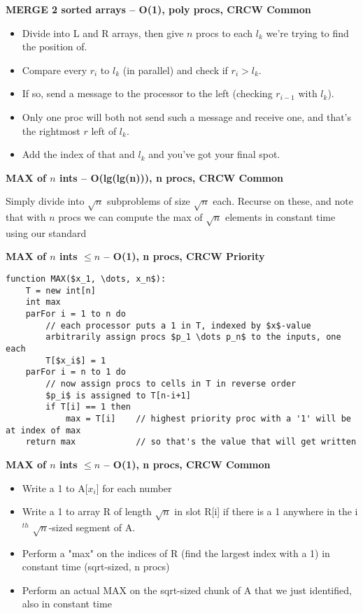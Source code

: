 \documentclass[12pt]{article}
\begin{document}
\begin{centering}\textbf{MERGE 2 sorted arrays -- O(1), poly procs, CRCW Common}\par\end{centering}
  \begin{itemize}
    \item Divide into L and R arrays, then give $n$ procs to each $l_k$ we're trying to find the position of.
    \item Compare every $r_i$ to $l_k$ (in parallel) and check if $r_i > l_k$.
    \item If so, send a message to the processor to the left (checking $r_{i-1}$ with $l_k$).
    \item Only one proc will both not send such a message and receive one, and that's the rightmost $r$ left of $l_k$.
    \item Add the index of that and $l_k$ and you've got your final spot.
\end{itemize}


\begin{centering}\textbf{MAX of $n$ ints -- O(lg(lg(n))), n procs, CRCW Common}\par\end{centering}
Simply divide into $\sqrt{n}$ subproblems of size $\sqrt{n}$ each. Recurse on these, and note that with $n$ procs
we can compute the max of $\sqrt{n}$ elements in constant time using our standard

\begin{centering}\textbf{MAX of $n$ ints $\leq n$ -- O(1), n procs, CRCW Priority}\par\end{centering}
\begin{lstlisting}
function MAX($x_1, \dots, x_n$):
    T = new int[n]
    int max
    parFor i = 1 to n do
        // each processor puts a 1 in T, indexed by $x$-value
        arbitrarily assign procs $p_1 \dots p_n$ to the inputs, one each
        T[$x_i$] = 1
    parFor i = n to 1 do
        // now assign procs to cells in T in reverse order
        $p_i$ is assigned to T[n-i+1]
        if T[i] == 1 then
            max = T[i]    // highest priority proc with a '1' will be at index of max
    return max            // so that's the value that will get written
\end{lstlisting}

\begin{centering}\textbf{MAX of $n$ ints $\leq n$ -- O(1), n procs, CRCW Common}\par\end{centering}
\begin{itemize}
  \item Write a 1 to A[$x_i$] for each number
  \item Write a 1 to array R of length $\sqrt{n}$ in slot R[i] if there is a 1 anywhere in the i$^{th}$ $\sqrt{n}$-sized segment of A.
  \item Perform a "max" on the indices of R (find the largest index with a 1) in constant time (sqrt-sized, n procs)
  \item Perform an actual MAX on the sqrt-sized chunk of A that we just identified, also in constant time
\end{itemize}
\end{document}
